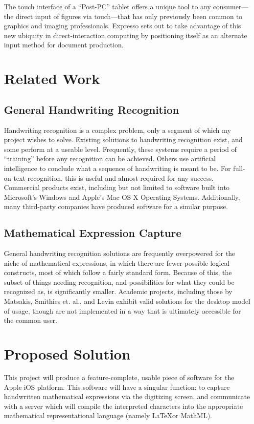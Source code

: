 \documentclass{acm_proc_article-sp}
\begin{document}
The touch interface of a ``Post-PC'' tablet offers a unique tool to any consumer---the direct input of figures via touch---that has only previously been common to graphics and imaging professionals. Expresso sets out to take advantage of this new ubiquity in direct-interaction computing by positioning itself as an alternate input method for document production.

\section{Related Work}

\subsection{General Handwriting Recognition} 
Handwriting recognition is a complex problem, only a segment of which my project wishes to solve. Existing solutions to handwriting recognition exist, and some  perform at a useable level. Frequently, these systems require a period of ``training'' before any recognition can be achieved. Others use artificial intelligence to conclude what a sequence of handwriting is meant to be. For full-on text recognition, this is useful and almost required for any success. Commercial products exist, including but not limited to software built into Microsoft's Windows and Apple's Mac OS X Operating Systems. Additionally, many third-party companies have produced software for a similar purpose.

\subsection{Mathematical Expression Capture}
General handwriting recognition solutions are frequently overpowered for the niche of mathematical expressions, in which there are fewer possible logical constructs, most of which follow a fairly standard form. Because of this, the subset of things needing recognition, and possibilities for what they could be recognized as, is significantly smaller. Academic projects, including those by Matsakis\cite{matsakis_recognition_1999}, Smithies et. al.\cite{smithies_handwriting-based_1999}, and Levin\cite{levin_cellwriter:_2007} exhibit valid solutions for the desktop model of usage, though are not implemented in a way that is ultimately accessible for the common user.

\section{Proposed Solution}
This project will produce a feature-complete, usable piece of software for the Apple iOS platform. This software will have a singular function: to capture handwritten mathematical expressions via the digitizing screen, and communicate with a server which will compile the interpreted characters into the appropriate mathematical representational language (namely \LaTeX or MathML). 
\end{document}

